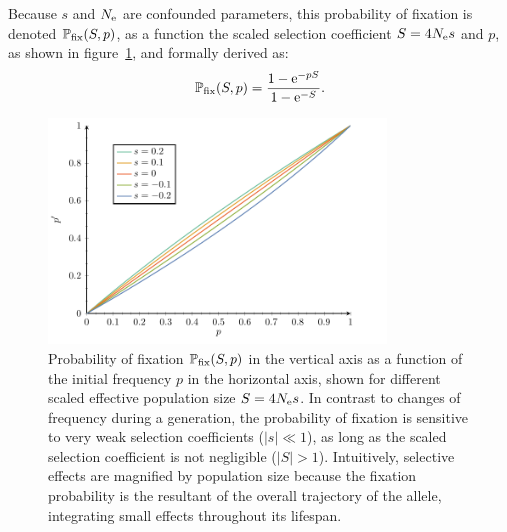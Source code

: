 Because $s$ and $N_{\text{e}}$ are confounded parameters, this probability of fixation is denoted $\mathbb{P}_{\text{fix}}(S, p)$, as a function the scaled selection coefficient $S = 4 N_{\text{e}} s$ and $p$, as shown in figure~\ref{fig:pfix-p}, and formally derived as:
\begin{equation}
    \mathbb{P}_{\text{fix}}(S, p) = \dfrac{1 - \text{e}^{- p S }}{1 - \text{e}^{-S}}.
\end{equation}


\begin{figure}[H]
    \centering
    \includegraphics[width=0.8\textwidth, page=3] {figures.pdf}
    \caption[Probability of fixation]{
    Probability of fixation $\mathbb{P}_{\text{fix}}(S, p)$ in the vertical axis as a function of the initial frequency $p$ in the horizontal axis, shown for different scaled \gls{effective population size} $S=4 N_{\text{e}} s$.
    In contrast to changes of frequency during a generation, the probability of fixation is sensitive to very weak selection coefficients ($|s| \ll 1$), as long as the scaled selection coefficient is not negligible ($|S| > 1$).
    Intuitively, selective effects are magnified by population size because the fixation probability is the resultant of the overall trajectory of the \gls{allele}, integrating small effects throughout its lifespan. }
    \label{fig:pfix-p}
\end{figure}

